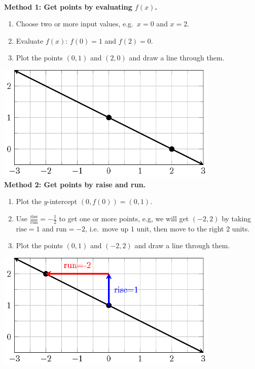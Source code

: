 \documentclass[
  en,11pt]{elegantbook}
\let\BeginKnitrBlock\begin \let\EndKnitrBlock\end
\begin{document}
\BeginKnitrBlock{solution}
{}\\

\textbf{Method 1: Get points by evaluating \(f(x)\).}

\begin{enumerate}
\def\labelenumi{\arabic{enumi}.}

\item
  Choose two or more input values, e.g.~\(x=0\) and \(x=2\).
\item
  Evaluate \(f(x)\): \(f(0)=1\) and \(f(2)=0\).
\item
  Plot the points \((0, 1)\) and \((2, 0)\) and draw a line through them.
\end{enumerate}

\includegraphics[width=0.8\textwidth,height=\textheight]{figs/tikz-linear-function-example-a.png}\\

\textbf{Method 2: Get points by raise and run.}

\begin{enumerate}
\def\labelenumi{\arabic{enumi}.}

\item
  Plot the \(y\)-intercept \((0, f(0))=(0, 1)\).
\item
  Use \(\frac{\text{rise}}{\text{run}}=-\frac{1}{2}\) to get one or more points, e.g, we will get \((-2, 2)\) by taking \(\text{rise}=1\) and \(\text{run}=-2\), i.e.~move up \(1\) unit, then move to the right \(2\) units.
\item
  Plot the points \((0, 1)\) and \((-2, 2)\) and draw a line through them.
\end{enumerate}

\includegraphics[width=0.8\textwidth,height=\textheight]{figs/tikz-linear-function-example-b.png}\\
\EndKnitrBlock{solution}
\end{document}
